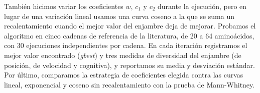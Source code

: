 También hicimos variar los coeficientes $w$, $c_1$ y $c_2$ durante la ejecución, pero en lugar de una variación lineal usamos una curva coseno a la que se suma un recalentamiento cuando el mejor valor del enjambre deja de mejorar. Probamos el algoritmo en cinco cadenas de referencia de la literatura, de 20 a 64 aminoácidos, con 30 ejecuciones independientes por cadena. En cada iteración registramos el mejor valor encontrado (\textit{gbest}) y tres medidas de diversidad del enjambre (de posición, de velocidad y cognitiva), y reportamos su media y desviación estándar. Por último, comparamos la estrategia de coeficientes elegida contra las curvas lineal, exponencial y coseno sin recalentamiento con la prueba de Mann-Whitney.
